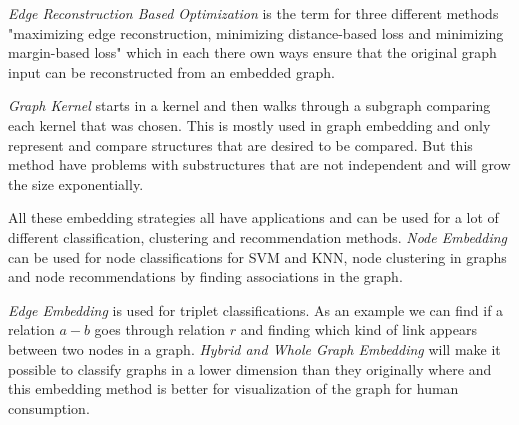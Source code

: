 \textit{Edge Reconstruction Based Optimization} is the term for three different methods "maximizing edge reconstruction, minimizing distance-based loss and minimizing margin-based loss" which in each there own ways ensure that the original graph input can be reconstructed from an embedded graph\cite{8294302}.

\textit{Graph Kernel} starts in a kernel and then walks through a subgraph comparing each kernel that was chosen. This is mostly used in graph embedding and only represent and compare structures that are desired to be compared. But this method have problems with substructures that are not independent and will grow the size exponentially\cite{8294302}.

All these embedding strategies all have applications and can be used for a lot of different classification, clustering and recommendation methods. \textit{Node Embedding} can be used for node classifications for SVM and KNN, node clustering in graphs and node recommendations by finding associations in the graph\cite{8294302}.

\textit{Edge Embedding} is used for triplet classifications. As an example we can find if a relation $a-b$ goes through relation $r$ and finding which kind of link appears between two nodes in a graph. \textit{Hybrid and Whole Graph Embedding} will make it possible to classify graphs in a lower dimension than they originally where and this embedding method is better for visualization of the graph for human consumption\cite{8294302}.
